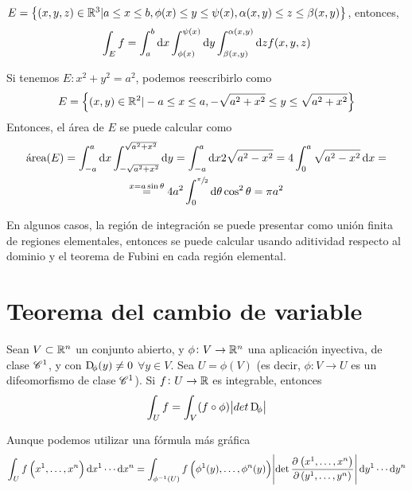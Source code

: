 \begin{example}
    $E = \left\{(x, y, z) \in \mathbb{R}^3 \vert a \leq x \leq b, \phi(x) \leq y \leq \psi(x), \alpha(x, y) \leq z \leq \beta(x,y)\right\}$,
    entonces,
    \[
        \int_E f = \int^b_a \dif x \int^{\psi(x)}_{\phi(x)} \dif y \int^{\alpha(x,y)}_{\beta\left( x, y \right)} \dif z f(x, y, z)
    \]
\end{example}

\begin{example}
    Si tenemos $E: x^2 + y^2 = a^2$, podemos reescribirlo como
    \[
        E = \left\{(x,y) \in \mathbb{R}^2 \vert -a \leq x \leq a, -\sqrt{a^2 + x^2} \leq y \leq \sqrt{a^2 + x^2}\right\}
    \]
    Entonces, el área de $E$ se puede calcular como
    \begin{gather*}
        \text{área}(E) = \int^a_{-a} \dif x \int^{\sqrt{a^2 + x^2}}_{-\sqrt{a^2 + x^2}} \dif y =
        \int^a_{-a} \dif x 2 \sqrt{a^2 - x^2} = 4 \int^a_0 \sqrt{a^2 - x^2} \dif x = \\
        \stackrel{x = a\sin\theta}{=} 4 a^2 \int^{\sfrac{\pi}{2}}_0 \dif \theta \cos^2 \theta = \pi a^2
    \end{gather*}
\end{example}

\begin{obs}
    En algunos casos, la región de integración se puede presentar como unión finita de regiones elementales, entonces se puede
    calcular usando aditividad respecto al dominio y el teorema de Fubini en cada región elemental.
\end{obs}

\section{Teorema del cambio de variable}

\begin{teo}\label{teo:cambio_variable}
    Sean $V \subset \mathbb{R}^n$ un conjunto abierto, y $\phi \colon V \to \mathbb{R}^n$ una aplicación inyectiva, de clase $\mathscr{C}^1$, y 
    con $\Dif_\phi(y) \neq 0$ $\forall y \in V$. Sea $U = \phi(V)$ (es decir, $\phi \colon V \to U$ es un difeomorfismo de clase
    $\mathscr{C}^1$). Si $f \colon U \to \mathbb{R}$ es integrable, entonces
    \[
        \int_U f = \int_V (f \circ \phi) \abs{det \Dif_\phi}
    \]

    Aunque podemos utilizar una fórmula más gráfica
    \[
        \int_U f \left( x^1, \dots, x^n \right) \dif x^1 \cdots \dif x^n =
        \int_{\inv{\phi}(U)} f\left( \phi^1(y), \dots, \phi^n(y) \right) \abs{\det\pdv{\left(x^1,\dots,x^n\right)}{\left(y^1,\dots,y^n\right)}}
        \dif y^1 \cdots \dif y^n
    \]
\end{teo}

